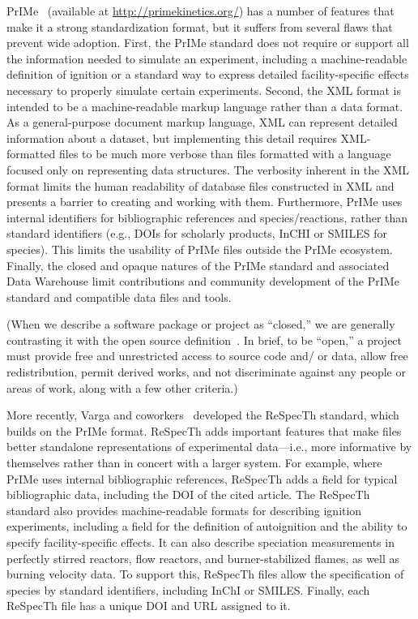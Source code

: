 \documentclass[12pt]{ijck}
\begin{document}
PrIMe~\autocite{Frenklach:2007bm,You:2011hy} (available at \url{http://primekinetics.org/})
has a number of features that make
it a strong standardization format, but it suffers from several flaws that
prevent wide adoption. First, the PrIMe standard does not require or support all
the information needed to simulate an experiment, including a machine-readable
definition of ignition or a standard way to express detailed facility-specific
effects necessary to properly simulate certain experiments. Second, the XML
format is intended to be a machine-readable markup language rather than a data format.
As a general-purpose document markup language, XML can represent detailed
information about a dataset, but implementing this detail requires XML-formatted
files to be much more verbose than files formatted with a language focused
only on representing data structures. The verbosity inherent in the XML format
limits the human readability of database files constructed in XML and presents a barrier to
creating and working with them. Furthermore, PrIMe uses
internal identifiers for bibliographic references and
species\slash reactions, rather than standard identifiers (e.g., DOIs for
scholarly products, InCHI or SMILES for species). This limits the usability of PrIMe files outside
the PrIMe ecosystem. Finally, the closed and opaque natures of the PrIMe standard
and associated Data Warehouse limit contributions and community development of
the PrIMe standard and compatible data files and tools.

(When we describe a software package or project as ``closed,'' we are generally
contrasting it with the open source definition~\cite{opensource}. In brief, to be
``open,'' a project must provide free and unrestricted access to source code and\slash
or data, allow free redistribution, permit derived works, and not discriminate against
any people or areas of work, along with a few other criteria.)

More recently, Varga and coworkers~\autocite{Varga2015a,Varga2017} developed the
ReSpecTh standard, which builds on the PrIMe format. ReSpecTh adds important
features that make files better standalone representations of experimental
data---i.e., more informative by themselves rather than in concert with a larger
system. For example, where PrIMe uses internal bibliographic references,
ReSpecTh adds a field for typical bibliographic data, including the DOI of
the cited article. The ReSpecTh standard also
provides machine-readable formats for describing ignition experiments, including
a field for the definition of autoignition and the ability to specify
facility-specific effects. It can also describe speciation measurements in
perfectly stirred reactors, flow reactors, and burner-stabilized flames, as well as
burning velocity data. To support this, ReSpecTh files allow the specification of species by
standard identifiers, including InChI or SMILES. Finally, each ReSpecTh file
has a unique DOI and URL assigned to it.
\end{document}

